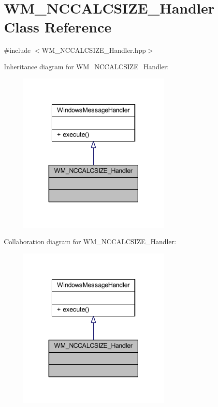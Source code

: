 \hypertarget{class_w_m___n_c_c_a_l_c_s_i_z_e___handler}{}\section{W\+M\+\_\+\+N\+C\+C\+A\+L\+C\+S\+I\+Z\+E\+\_\+\+Handler Class Reference}
\label{class_w_m___n_c_c_a_l_c_s_i_z_e___handler}


{\ttfamily \#include $<$W\+M\+\_\+\+N\+C\+C\+A\+L\+C\+S\+I\+Z\+E\+\_\+\+Handler.\+hpp$>$}



Inheritance diagram for W\+M\+\_\+\+N\+C\+C\+A\+L\+C\+S\+I\+Z\+E\+\_\+\+Handler\+:\nopagebreak
\begin{figure}[H]
\begin{center}
\leavevmode
\includegraphics[width=218pt]{class_w_m___n_c_c_a_l_c_s_i_z_e___handler__inherit__graph}
\end{center}
\end{figure}


Collaboration diagram for W\+M\+\_\+\+N\+C\+C\+A\+L\+C\+S\+I\+Z\+E\+\_\+\+Handler\+:\nopagebreak
\begin{figure}[H]
\begin{center}
\leavevmode
\includegraphics[width=218pt]{class_w_m___n_c_c_a_l_c_s_i_z_e___handler__coll__graph}
\end{center}
\end{figure}
